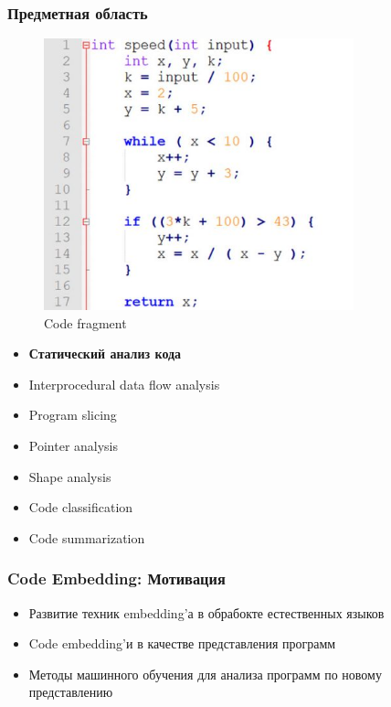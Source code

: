 \documentclass[xcolor=table,english]{beamer}
\begin{document}
\begin{frame}[fragile] \frametitle{Предметная область}
    \begin{minipage}[m]{0.45\linewidth}
        \begin{figure}
            \centering
            \includegraphics[width=0.8\textwidth]{figures/static_code_analysis.jpg}
            \caption{Code fragment}
            \label{fig:code_fragment}
        \end{figure}
    \end{minipage}\hfill
    \begin{minipage}[m]{0.55\linewidth}
        \begin{itemize}
            \item \textbf{Статический анализ кода}
            \item Interprocedural data flow analysis
            \item Program slicing
            \item Pointer  analysis
            \item Shape analysis
            \item Code classification
            \item Code summarization
        \end{itemize}
    \end{minipage}
\end{frame}

\begin{frame}[fragile] \frametitle{Code Embedding: Мотивация}
    \begin{itemize}
        \item Развитие техник embedding'а в обрабокте естественных языков
        \item Code embedding'и в качестве представления программ
        \item Методы машинного обучения для анализа программ по новому представлению
    \end{itemize}
\end{frame}
\end{document}
